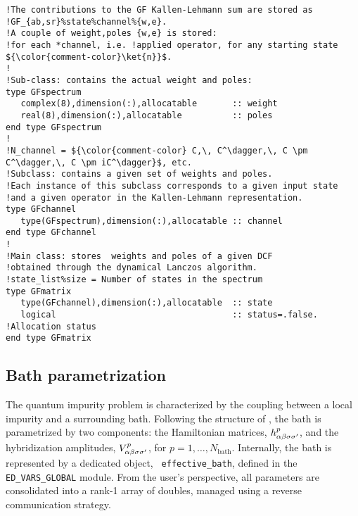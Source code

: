 \documentclass[edipack_sp.tex]{subfiles}
\begin{document}
\begin{lstlisting}[style=fstyle,numbers=none]   
!The contributions to the GF Kallen-Lehmann sum are stored as
!GF_{ab,sr}%state%channel%{w,e}.
!A couple of weight,poles {w,e} is stored: 
!for each *channel, i.e. !applied operator, for any starting state ${\color{comment-color}\ket{n}}$.
!
!Sub-class: contains the actual weight and poles:
type GFspectrum
   complex(8),dimension(:),allocatable       :: weight
   real(8),dimension(:),allocatable          :: poles
end type GFspectrum
!
!N_channel = ${\color{comment-color} C,\, C^\dagger,\, C \pm C^\dagger,\, C \pm iC^\dagger}$, etc.
!Subclass: contains a given set of weights and poles.
!Each instance of this subclass corresponds to a given input state 
!and a given operator in the Kallen-Lehmann representation.  
type GFchannel
   type(GFspectrum),dimension(:),allocatable :: channel 
end type GFchannel
!
!Main class: stores  weights and poles of a given DCF 
!obtained through the dynamical Lanczos algorithm.
!state_list%size = Number of states in the spectrum 
type GFmatrix
   type(GFchannel),dimension(:),allocatable  :: state
   logical                                   :: status=.false. !Allocation status
end type GFmatrix
\end{lstlisting}




















\subsection{Bath parametrization}\label{sSecBath}
The quantum impurity problem is characterized by the coupling between
a local impurity and a surrounding bath. Following the structure of
, the bath is parametrized by two components: the
Hamiltonian matrices, $h_{\alpha\beta\sigma\sigma'}^p$, and the hybridization amplitudes,
$V_{\alpha\beta\sigma\sigma'}^p$, for $p = 1, \dots, N_\mathrm{bath}$.
Internally, the bath is represented by a dedicated object, {\tt
  effective\_bath}, defined in the {\tt ED\_VARS\_GLOBAL} module. From
the user's perspective, all parameters are consolidated into a rank-1
array of doubles, managed using a reverse communication strategy. 
\end{document}
